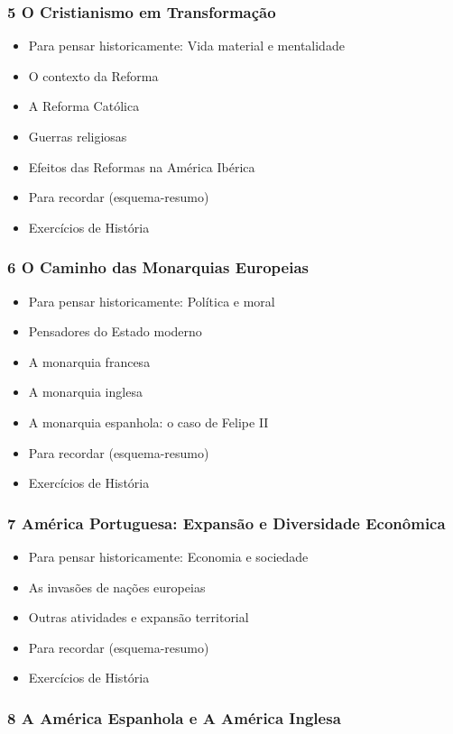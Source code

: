 \documentclass[a4paper,12pt]{article}[abntex2]
\begin{document}
\subsubsection*{5 O Cristianismo em Transformação}

\begin{itemize}
\item Para pensar historicamente: Vida material e mentalidade
\item O contexto da Reforma
\item A Reforma Católica
\item Guerras religiosas
\item Efeitos das Reformas na América Ibérica
\item Para recordar (esquema-resumo)
\item Exercícios de História
\end{itemize}
\subsubsection*{6 O Caminho das Monarquias Europeias}

\begin{itemize}
\item Para pensar historicamente: Política e moral
\item Pensadores do Estado moderno
\item A monarquia francesa
\item A monarquia inglesa
\item A monarquia espanhola: o caso de Felipe II
\item Para recordar (esquema-resumo)
\item Exercícios de História
\end{itemize}
\subsubsection*{7 América Portuguesa: Expansão e Diversidade Econômica}

\begin{itemize}
\item Para pensar historicamente: Economia e sociedade
\item As invasões de nações europeias
\item Outras atividades e expansão territorial
\item Para recordar (esquema-resumo)
\item Exercícios de História
\end{itemize}
\subsubsection*{8 A América Espanhola e A América Inglesa}
\end{document}
